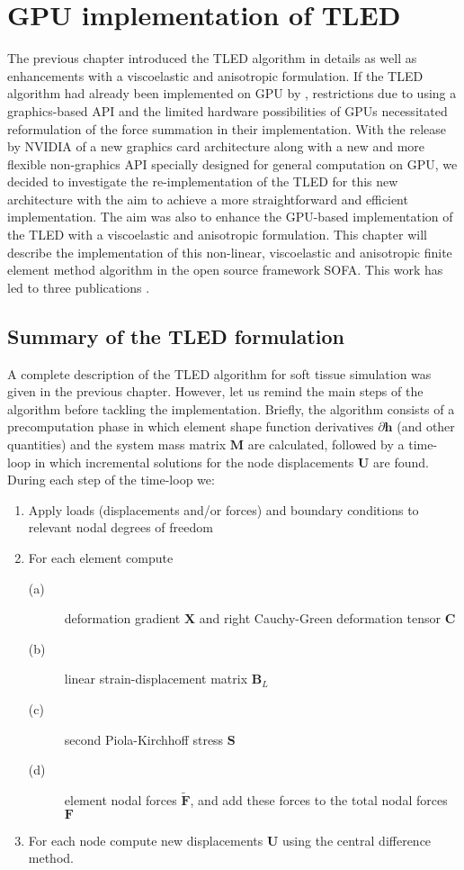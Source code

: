 \chapter{GPU implementation of TLED}
\label{chap6}
\begin{shortAbstract}
The previous chapter introduced the TLED algorithm in details as well as enhancements with a viscoelastic and anisotropic formulation. If the TLED algorithm had already been implemented on GPU by \cite{Taylor07b}, restrictions due to using a graphics-based API and the limited hardware possibilities of GPUs necessitated reformulation of the force summation in their implementation. With the release by NVIDIA of a new graphics card architecture along with a new and more flexible non-graphics API specially designed for general computation on GPU, we decided to investigate the re-implementation of the TLED for this new architecture with the aim to achieve a more straightforward and efficient implementation. The aim was also to enhance the GPU-based implementation of the TLED with a viscoelastic and anisotropic formulation. This chapter will describe the implementation of this non-linear, viscoelastic and anisotropic finite element method algorithm in the open source framework SOFA. This work has led to three publications \citep{Comas2008,Taylor2008,Taylor2009}.
\end{shortAbstract}

\section{Summary of the TLED formulation}
A complete description of the TLED algorithm for soft tissue simulation was given in the previous chapter. However, let us remind the main steps of the algorithm before tackling the implementation. Briefly, the algorithm consists of a precomputation phase in which element shape function derivatives $ \partial \mathbf{h} $ (and other quantities) and the system mass matrix $ \mathbf{M} $ are calculated, followed by a time-loop in which incremental solutions for the node displacements $ \mathbf{U} $ are found. During each step of the time-loop we:
\begin{enumerate}
\item Apply loads (displacements and/or forces) and boundary conditions to relevant nodal degrees of freedom
\item For each element compute
\begin{description}
\item[(a)] deformation gradient $ \mathbf{X} $ and right Cauchy-Green deformation tensor $ \mathbf{C} $
\item[(b)] linear strain-displacement matrix $ \mathbf{B}_L $
\item[(c)] second Piola-Kirchhoff stress $ \mathbf{S} $
\item[(d)] element nodal forces $ \mathbf{\tilde{F}} $, and add these forces to the total nodal forces $ \mathbf{F} $
\end{description}
\item For each node compute new displacements $ \mathbf{U} $ using the central difference method.
\end{enumerate}

